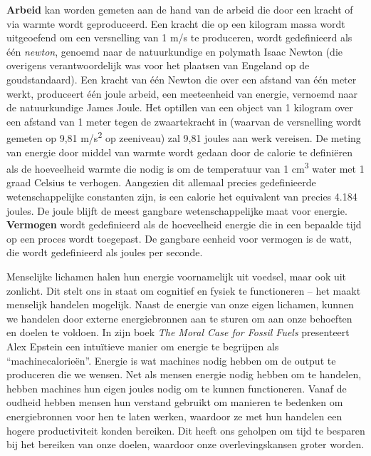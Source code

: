 \textbf{Arbeid} kan worden gemeten aan de hand van de arbeid die door een kracht of via warmte wordt geproduceerd. Een kracht die op een kilogram massa wordt uitgeoefend om een versnelling van 1 m/s te produceren, wordt gedefinieerd als één \emph{newton}, genoemd naar de natuurkundige en polymath Isaac Newton (die overigens verantwoordelijk was voor het plaatsen van Engeland op de goudstandaard). Een kracht van één Newton die over een afstand van één meter werkt, produceert één joule arbeid, een meeteenheid van energie, vernoemd naar de natuurkundige James Joule. Het optillen van een object van 1 kilogram over een afstand van 1 meter tegen de zwaartekracht in (waarvan de versnelling wordt gemeten op 9,81 m/s\textsuperscript{2} op zeeniveau) zal 9,81 joules aan werk vereisen. De meting van energie door middel van warmte wordt gedaan door de calorie te definiëren als de hoeveelheid warmte die nodig is om de temperatuur van 1 cm\textsuperscript{3} water met 1 graad Celsius te verhogen. Aangezien dit allemaal precies gedefinieerde wetenschappelijke constanten zijn, is een calorie het equivalent van precies 4.184 joules. De joule blijft de meest gangbare wetenschappelijke maat voor energie. \textbf{Vermogen} wordt gedefinieerd als de hoeveelheid energie die in een bepaalde tijd op een proces wordt toegepast. De gangbare eenheid voor vermogen is de watt, die wordt gedefinieerd als joules per seconde.

Menselijke lichamen halen hun energie voornamelijk uit voedsel, maar ook uit zonlicht. Dit stelt ons in staat om cognitief en fysiek te functioneren -- het maakt menselijk handelen mogelijk. Naast de energie van onze eigen lichamen, kunnen we handelen door externe energiebronnen aan te sturen om aan onze behoeften en doelen te voldoen. In zijn boek \emph{The Moral Case for Fossil Fuels} presenteert Alex Epstein een intuïtieve manier om energie te begrijpen als ``machinecalorieën''. \autocite{92} Energie is wat machines nodig hebben om de output te produceren die we wensen. Net als mensen energie nodig hebben om te handelen, hebben machines hun eigen joules nodig om te kunnen functioneren. Vanaf de oudheid hebben mensen hun verstand gebruikt om manieren te bedenken om energiebronnen voor hen te laten werken, waardoor ze met hun handelen een hogere productiviteit konden bereiken. Dit heeft ons geholpen om tijd te besparen bij het bereiken van onze doelen, waardoor onze overlevingskansen groter worden.

